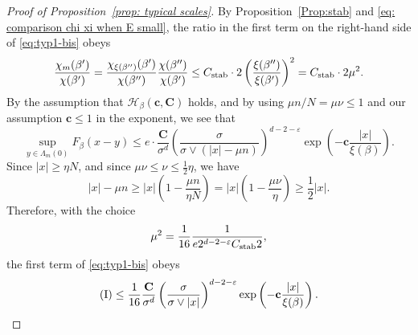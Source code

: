 \documentclass[11pt,a4paper]{article}
\numberwithin{equation}{section}
\theoremstyle{plain}
\theoremstyle{definition}
\newcommand\1{\mathds{1}}
\newcommand\bfc{\mathbf{c}}
\newcommand\bfC{\mathbf{C}}
\newcommand{\Cstab}{C_{\textup{stab}}}
\begin{document}
\begin{proof}[Proof of Proposition~\textup{\ref{prop: typical scales}}]
By Proposition~\ref{Prop:stab} and \eqref{eq: comparison chi xi when E small}, the ratio in the first term on
the right-hand side of \eqref{eq:typ1-bis} obeys
\begin{equation}
    \frac{\chi_m(\beta')}{\chi(\beta')}
    =
    \frac{\chi_{\xi(\beta'')}(\beta')}{\chi(\beta'')}
    \frac{\chi(\beta'')}{\chi(\beta')}
    \le
    \Cstab\cdot 2\left(\frac{\xi(\beta'')}{\xi(\beta')}\right)^{2}
    =
    \Cstab \cdot 2\mu^2.
\end{equation}
By the assumption that $\mathcal H_\beta(\bfc,\bfC)$ holds,
and by using $\mu  n/N =\mu\nu \le 1$ and our assumption
 $\bfc \le 1$ in the exponent, we see that
\begin{equation}
    \sup_{y \in \Lambda_m(0)} F_\beta(x-y)
    \le
    e \cdot \frac{\bfC}{\sigma^d}
    \left(\frac{\sigma}{\sigma\vee(|x|-\mu n)}\right)^{d-2-\varepsilon}
    \exp\left(-\bfc\frac{|x| }{\xi(\beta)}\right).
\end{equation}
Since $|x|\ge\eta N$, and since $\mu\nu \le \nu \le \frac 12 \eta$, we have
\begin{equation}
    |x| -\mu n \ge |x|\left( 1- \frac{\mu n}{\eta N} \right)
    =
    |x|\left( 1- \frac{\mu\nu }{\eta} \right) \ge \frac 12 |x|.
\end{equation}
Therefore, with the choice
\begin{equation}
\label{eq:lambda-choice}
    \mu^2 = \frac{1}{16} \frac{1}{e 2^{d-2-\varepsilon}\Cstab 2},
\end{equation}
the first term of \eqref{eq:typ1-bis} obeys
\begin{equation}
\label{eq:typIbd}
    ({\rm I})
    \le
    \frac{1}{16}
    \frac{\bfC}{\sigma^d}
    \left(\frac{\sigma}{\sigma\vee|x| }\right)^{d-2-\varepsilon}
    \exp\left(-\bfc\frac{|x| }{\xi(\beta)}\right).
\end{equation}


\end{proof}
\end{document}
